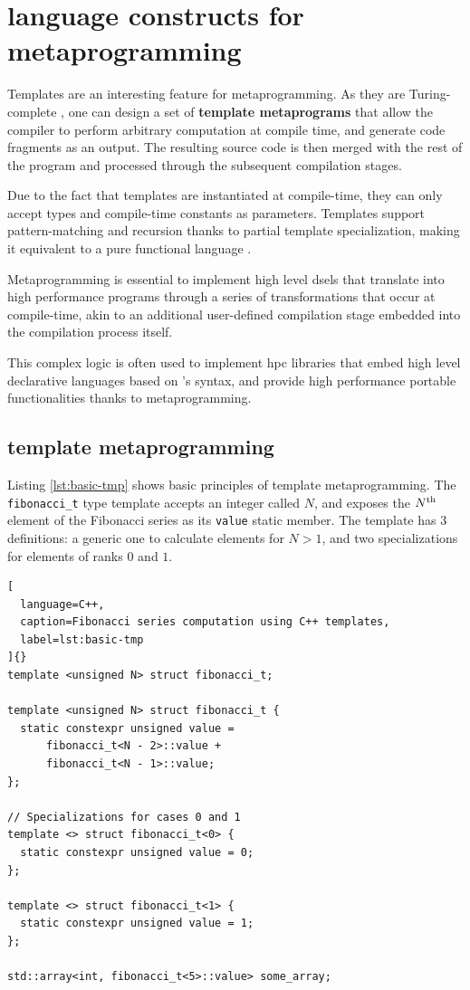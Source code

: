 \documentclass[../main]{subfiles}
\begin{document}
\section{
  \cpp language constructs for metaprogramming
}
\label{lbl:cpp-meta-constructs}

Templates are an interesting feature for metaprogramming. As they
are Turing-complete \cite{unruh:1994}, one can design a set of
\textbf{template metaprograms} \cite{abrahams:2004} that allow the compiler
to perform arbitrary computation at compile time, and generate
\cpp code fragments as an output.
The resulting source code is then merged with the rest of the program
and processed through the subsequent compilation stages.

Due to the fact that templates are instantiated at compile-time, they can only
accept types and compile-time constants as parameters. Templates support
pattern-matching and recursion thanks to partial template specialization,
making it equivalent to a pure functional language \cite{haeri:2012}.

Metaprogramming is essential to implement high level \glspl{dsel} that translate
into high performance programs through a series of transformations that
occur at compile-time, akin to an additional user-defined compilation stage
embedded into the compilation process itself.

This complex logic is often used to implement \gls{hpc} libraries that embed
high level declarative languages based on \cpp's syntax, and provide
high performance portable functionalities thanks to metaprogramming.

\subsection{
  \cpp template metaprogramming
}

Listing \ref{lst:basic-tmp} shows basic principles of \cpp template
metaprogramming. The \lstinline{fibonacci_t} type template accepts an
integer called $N$, and exposes the $N\textsuperscript{th}$ element
of the Fibonacci series as its \lstinline{value} static member.
The template has 3 definitions:
a generic one to calculate elements for $N > 1$,
and two specializations for elements of ranks $0$ and $1$.

\begin{lstlisting}[
  language=C++,
  caption=Fibonacci series computation using C++ templates,
  label=lst:basic-tmp
]{}
template <unsigned N> struct fibonacci_t;

template <unsigned N> struct fibonacci_t {
  static constexpr unsigned value =
      fibonacci_t<N - 2>::value +
      fibonacci_t<N - 1>::value;
};

// Specializations for cases 0 and 1
template <> struct fibonacci_t<0> {
  static constexpr unsigned value = 0;
};

template <> struct fibonacci_t<1> {
  static constexpr unsigned value = 1;
};

std::array<int, fibonacci_t<5>::value> some_array;
\end{lstlisting}
\end{document}

